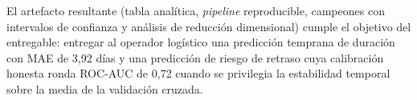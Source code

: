 \documentclass[journal]{IEEEtran}
\begin{document}
El artefacto resultante (tabla analítica, \textit{pipeline} reproducible, campeones con intervalos de confianza y análisis de reducción dimensional) cumple el objetivo del entregable: entregar al operador logístico una predicción temprana de duración con MAE de 3,92 días y una predicción de riesgo de retraso cuya calibración honesta ronda ROC-AUC de 0,72 cuando se privilegia la estabilidad temporal sobre la media de la validación cruzada.

\balance


\end{document}
